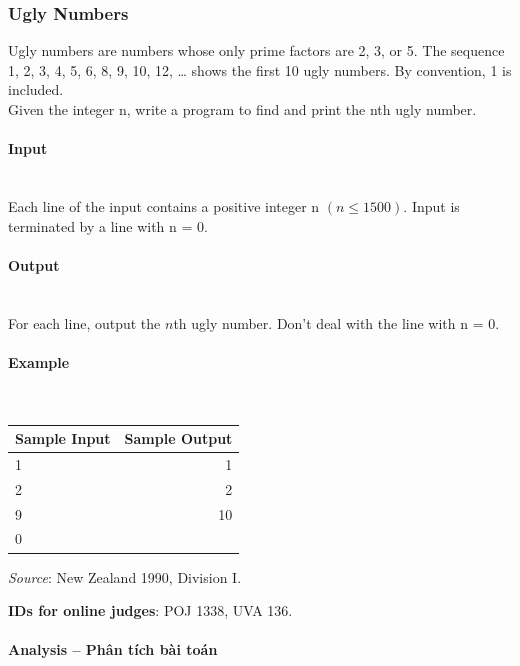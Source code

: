\documentclass{article}
\begin{document}

\subsubsection{Ugly Numbers}

Ugly numbers are numbers whose only prime factors are 2, 3, or 5. The sequence 1, 2, 3, 4, 5, 6, 8, 9, 10, 12, … shows the first 10 ugly numbers. By convention, 1 is included. \\
Given the integer n, write a program to find and print the nth ugly number.

\paragraph{Input} \mbox{} \\

Each line of the input contains a positive integer n $(n \leq 1500)$. Input is terminated by a line with n = 0.

\paragraph{Output}\mbox{} \\
For each line, output the $n$th ugly number. Don’t deal with the line with n = 0.


\paragraph{Example}\mbox{} \\

\begin{table}[h]
    \centering
    \begin{tabular}{|l|r|}
        \hline
        \textbf{Sample Input} & \textbf{Sample Output} \\
        \hline
        1 & 1  \\ 
        2  & 2 \\ 
        9   & 10 \\ 
        0   &  \\  \hline
    \end{tabular}
\end{table}

\textit{Source}: New Zealand 1990, Division I.

\textbf{IDs for online judges}: POJ 1338, UVA 136.


\paragraph{Analysis -- Phân tích bài toán} \mbox{} \\
\end{document}
